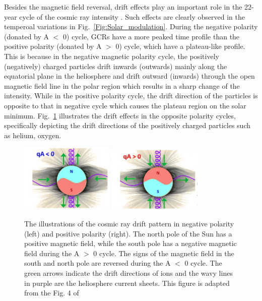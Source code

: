 Besides the magnetic field reversal, drift effects play an important role in the 22-year cycle of the cosmic ray intensity \citep{Jokipii1977ApJ}. Such effects are clearly observed in the temperoal variations in Fig.~\ref{Fig:Solar_modulation}.
During the negative polarity (donated by A $<$ 0) cycle, \acp{GCR} have a more peaked time profile than the positive polarity (donated by A $>$ 0) cycle, which have a plateau-like profile. 
This is because in the negative magnetic polarity cycle, the positively (negatively) charged particles drift inwards (outwards) mainly along the equatorial plane in the heliosphere and drift outward (inwards) through the open magnetic field line in the polar region which results in a sharp change of the intensity. While in the positive polarity cycle, the drift direction of the particles is opposite to that in negative cycle which causes the plateau region on the solar minimum. Fig.~\ref{Fig:drift_effect} illustrates the drift effects in the opposite polarity cycles, specifically depicting the drift directions of the positively charged particles such as helium, oxygen.

\begin{figure}
	\centering
	\includegraphics[width = 0.4\textwidth]{images/drift_effect.png}
	\includegraphics[width = 0.4\textwidth]{images/drift_effect_2.png}
	\caption[The gloabl drift pattern of positively charged particles in different polarity]{The illustrations of the cosmic ray drift pattern in negative polarity (left) and positive polarity (right). The north pole of the Sun has a positive magnetic field, while the south pole has a negative magnetic field during the A $>$ 0 cycle. The signs of the magnetic field in the south and north pole are reversed during the A $<$ 0 cycle. The green arrows indicate the drift directions of ions and the wavy lines in purple are the heliosphere current sheets. This figure is adapted from the Fig. 4 of \citet{Rankin2022ApJ}}
	\label{Fig:drift_effect}	
\end{figure}

